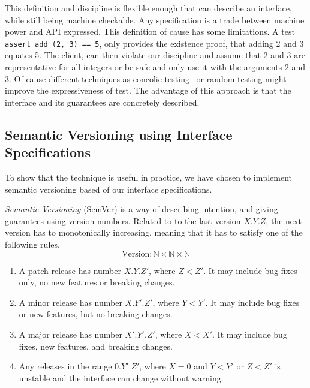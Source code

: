 This definition and discipline is flexible enough that can describe an
interface, while still being machine checkable. Any specification is a trade
between machine power and API expressed. This definition of cause has some
limitations. A test \texttt{assert add (2, 3) == 5}, only provides the existence proof,
that adding 2 and 3 equates 5. The client, can then violate our discipline and
assume that 2 and 3 are representative for all integers or be safe and only use
it with the arguments 2 and 3. Of cause different techniques as concolic
testing~\cite{sen05-cute} or random testing might improve the expressiveness of test. The
advantage of this approach is that the interface and its guarantees are
concretely described. 

\subsection{Semantic Versioning using Interface Specifications}

To show that the technique is useful in practice, we have chosen to implement
semantic versioning based of our interface specifications.

\begin{definition}\textit{Semantic Versioning} (SemVer) is a way of describing
intention, and giving guarantees using version numbers\cite{semver}.
Related to to the last version $X.Y.Z$, the next version has to
monotonically increasing, meaning that it has to satisfy one of the
following rules.
$$ \text{Version} : \mathbb{N} \times \mathbb{N} \times \mathbb{N} $$

\begin{enumerate}
    \item A patch release has number $X.Y.Z'$, where $Z < Z'$. It may include
    bug fixes only, no new features or breaking changes.
    
    \item A minor release has number $X.Y'.Z'$, where $Y < Y'$. It may include
    bug fixes or new features, but no breaking changes.
    
    \item A major release has number $X'.Y'.Z'$, where $X < X'$. It may include
    bug fixes, new features, and breaking changes.
    
    \item Any releases in the range $0.Y'.Z'$, where $X = 0$ and $Y < Y'$ or $Z
    < Z'$ is unstable and the interface can change without warning.
\end{enumerate}

\end{definition}

